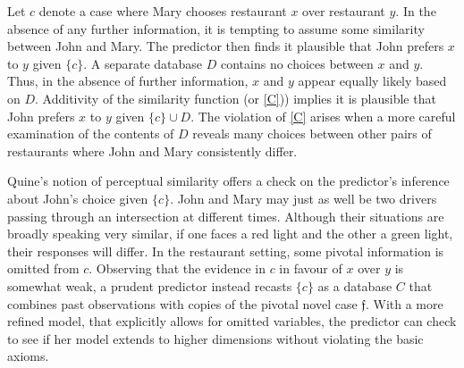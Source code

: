 \documentclass[12pt,a4paper,twoside]{article}
\newcommand{\gsii}{$\textup{[GS]}$}
\newcommand{\novel}{\mathfrak f}
\begin{document}

  \begin{example*}[second-order induction, \gsii, p.12] \label{eg-john_mary} Let
    $c$ denote a case where Mary chooses restaurant $x$ over restaurant $y$. In
    the absence of any further information, it is tempting to assume some
    similarity between John and Mary. The predictor then finds it plausible that
    John prefers $x$ to $y$ given $\{c\}$. A separate database $D$ contains no
    choices between $x$ and $y$. Thus, in the absence of further information,
    $x$ and $y$ appear equally likely based on $D$. Additivity of the similarity
    function (or \ref{C})) implies it is plausible that John prefers $x$ to $y$
    given $\{c\} \cup D$. The violation of \ref{C} arises when a more careful
    examination of the contents of $D$ reveals many choices between other pairs
    of restaurants where John and Mary consistently differ.
\end{example*}
Quine's notion of perceptual similarity \citep{Quine-Roots_of_reference} offers
a check on the predictor's inference about John's choice given $\{c\}$. John and
Mary may just as well be two drivers passing through an intersection at
different times. Although their situations are broadly speaking very similar, if
one faces a red light and the other a green light, their responses will
differ. In the restaurant setting, some pivotal information is omitted from $c$.
Observing that the evidence in $c$ in favour of $x$ over $y$ is somewhat weak, a
prudent predictor instead recasts $\{c\}$ as a database $C$ that combines past
observations with copies of the pivotal novel case $\novel$.  With a more
refined model, that explicitly allows for omitted variables, the predictor can
check to see if her model extends to higher dimensions without violating the
basic axioms.
\end{document}
